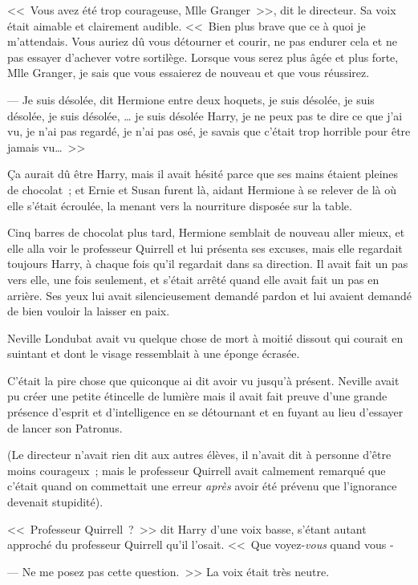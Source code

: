 <<~Vous avez été trop courageuse, Mlle Granger~>>, dit le directeur. Sa voix était aimable et clairement audible. <<~Bien plus brave que ce à quoi je m'attendais. Vous auriez dû vous détourner et courir, ne pas endurer cela et ne pas essayer d'achever votre sortilège. Lorsque vous serez plus âgée et plus forte, Mlle Granger, je sais que vous essaierez de nouveau et que vous réussirez.

--- Je suis désolée, dit Hermione entre deux hoquets, je suis désolée, je suis désolée, je suis désolée, … je suis désolée Harry, je ne peux pas te dire ce que j'ai vu, je n'ai pas regardé, je n'ai pas osé, je savais que c'était trop horrible pour être jamais vu…~>>

Ça aurait dû être Harry, mais il avait hésité parce que ses mains étaient pleines de chocolat~; et Ernie et Susan furent là, aidant Hermione à se relever de là où elle s'était écroulée, la menant vers la nourriture disposée sur la table.

Cinq barres de chocolat plus tard, Hermione semblait de nouveau aller mieux, et elle alla voir le professeur Quirrell et lui présenta ses excuses, mais elle regardait toujours Harry, à chaque fois qu'il regardait dans sa direction. Il avait fait un pas vers elle, une fois seulement, et s'était arrêté quand elle avait fait un pas en arrière. Ses yeux lui avait silencieusement demandé pardon et lui avaient demandé de bien vouloir la laisser en paix.

\later

Neville Londubat avait vu quelque chose de mort à moitié dissout qui courait en suintant et dont le visage ressemblait à une éponge écrasée.

C'était la pire chose que quiconque ai dit avoir vu jusqu'à présent. Neville avait pu créer une petite étincelle de lumière mais il avait fait preuve d'une grande présence d'esprit et d'intelligence en se détournant et en fuyant au lieu d'essayer de lancer son Patronus.

(Le directeur n'avait rien dit aux autres élèves, il n'avait dit à personne d'être moins courageux~; mais le professeur Quirrell avait calmement remarqué que c'était quand on commettait une erreur \emph{après} avoir été prévenu que l'ignorance devenait stupidité).

<<~Professeur Quirrell~?~>> dit Harry d'une voix basse, s'étant autant approché du professeur Quirrell qu'il l'osait. <<~Que voyez-\emph{vous} quand vous -

--- Ne me posez pas cette question.~>> La voix était très neutre.

